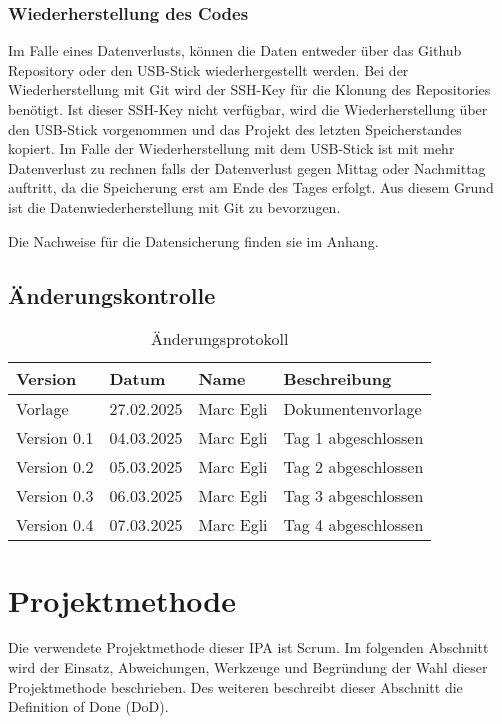 
\subsection{Wiederherstellung des Codes}
Im Falle eines Datenverlusts, können die Daten entweder über das Github Repository oder den USB-Stick wiederhergestellt werden.
Bei der Wiederherstellung mit Git wird der SSH-Key für die Klonung des Repositories benötigt. Ist
dieser SSH-Key nicht verfügbar, wird die Wiederherstellung über den USB-Stick vorgenommen und das Projekt des letzten Speicherstandes
kopiert. Im Falle der Wiederherstellung mit dem USB-Stick ist mit mehr Datenverlust zu rechnen falls der Datenverlust gegen Mittag oder Nachmittag auftritt, da
die Speicherung erst am Ende des Tages erfolgt. Aus diesem Grund ist die Datenwiederherstellung mit Git zu bevorzugen.

Die Nachweise für die Datensicherung finden sie im Anhang.

\newpage

\section{Änderungskontrolle}
\begin{table}[h!]
    \begin{tabular}{|L{0.2\textwidth}|L{0.2\textwidth}|L{0.2\textwidth}|L{0.3\textwidth}|}
        \color{white}Version & \color{white} Datum & \color{white} Name & \color{white} Beschreibung \\
        \hline
        Vorlage & 27.02.2025 &  Marc Egli & Dokumentenvorlage \\
        \hline
        Version 0.1 & 04.03.2025 &  Marc Egli & Tag 1 abgeschlossen \\
        \hline
        Version 0.2 & 05.03.2025 &  Marc Egli & Tag 2 abgeschlossen \\
        \hline
        Version 0.3 & 06.03.2025 &  Marc Egli & Tag 3 abgeschlossen \\
        \hline
        Version 0.4 & 07.03.2025 &  Marc Egli & Tag 4 abgeschlossen \\
        \hline
      \end{tabular}
      \caption{Änderungsprotokoll}
 \end{table}

\chapter{Projektmethode}
Die verwendete Projektmethode dieser IPA ist Scrum. Im folgenden Abschnitt wird der Einsatz, Abweichungen, Werkzeuge und Begründung der Wahl
dieser Projektmethode beschrieben. Des weiteren beschreibt dieser Abschnitt die Definition of Done (DoD).

